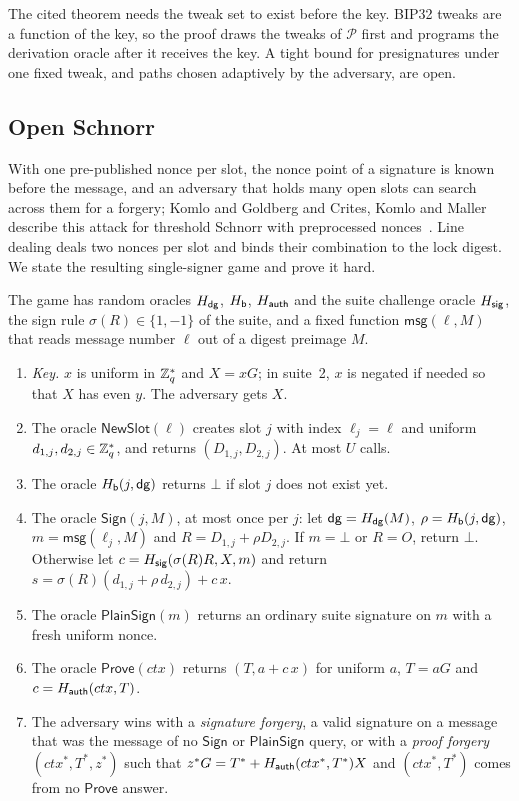 The cited theorem needs the tweak set to exist before the key. BIP32 tweaks are a function of the key, so the proof draws the tweaks of $\mathcal{P}$ first and programs the derivation oracle after it receives the key. A tight bound for presignatures under one fixed tweak, and paths chosen adaptively by the adversary, are open.

\subsection{Open Schnorr}\label{sec:sec-schnorr}

With one pre-published nonce per slot, the nonce point of a signature is known before the message, and an adversary that holds many open slots can search across them for a forgery; Komlo and Goldberg and Crites, Komlo and Maller describe this attack for threshold Schnorr with preprocessed nonces~\cite{FROST,Sparkle}. Line dealing deals two nonces per slot and binds their combination to the lock digest. We state the resulting single-signer game and prove it hard.

\begin{definition}\label{def:tns}
The game has random oracles $H_{\mathsf{dg}}$, $H_{\mathsf{b}}$, $H_{\mathsf{auth}}$ and the suite challenge oracle $H_{\mathsf{sig}}$, the sign rule $\sigma(R) \in \{1, -1\}$ of the suite, and a fixed function $\mathsf{msg}(\ell, M)$ that reads message number $\ell$ out of a digest preimage $M$.
\begin{enumerate}[leftmargin=1.7em,itemsep=1pt]
\item \emph{Key.} $x$ is uniform in $\mathbb{Z}_q^*$ and $X = xG$; in suite~2, $x$ is negated if needed so that $X$ has even $y$. The adversary gets $X$.
\item The oracle $\mathsf{NewSlot}(\ell)$ creates slot $j$ with index $\ell_j = \ell$ and uniform $d_{1,j}, d_{2,j} \in \mathbb{Z}_q^*$, and returns $(D_{1,j}, D_{2,j})$. At most $U$ calls.
\item The oracle $H_{\mathsf{b}}(j, \mathsf{dg})$ returns $\bot$ if slot $j$ does not exist yet.
\item The oracle $\mathsf{Sign}(j, M)$, at most once per $j$: let $\mathsf{dg} = H_{\mathsf{dg}}(M)$, $\rho = H_{\mathsf{b}}(j, \mathsf{dg})$, $m = \mathsf{msg}(\ell_j, M)$ and $R = D_{1,j} + \rho D_{2,j}$. If $m = \bot$ or $R = O$, return $\bot$. Otherwise let $c = H_{\mathsf{sig}}(\sigma(R) R, X, m)$ and return $s = \sigma(R)(d_{1,j} + \rho\, d_{2,j}) + c\,x$.
\item The oracle $\mathsf{PlainSign}(m)$ returns an ordinary suite signature on $m$ with a fresh uniform nonce.
\item The oracle $\mathsf{Prove}(ctx)$ returns $(T, a + c\,x)$ for uniform $a$, $T = aG$ and $c = H_{\mathsf{auth}}(ctx, T)$.
\item The adversary wins with a \emph{signature forgery}, a valid signature on a message that was the message of no $\mathsf{Sign}$ or $\mathsf{PlainSign}$ query, or with a \emph{proof forgery} $(ctx^*, T^*, z^*)$ such that $z^* G = T^* + H_{\mathsf{auth}}(ctx^*, T^*) X$ and $(ctx^*, T^*)$ comes from no $\mathsf{Prove}$ answer.
\end{enumerate}
\end{definition}


